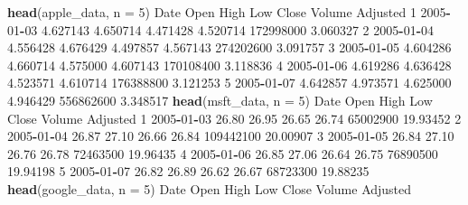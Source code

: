\documentclass[]{article}
\newenvironment{Shaded}{\begin{snugshade}}{\end{snugshade}}
\newcommand{\KeywordTok}[1]{\textcolor[rgb]{0.13,0.29,0.53}{\textbf{#1}}}
\newcommand{\DataTypeTok}[1]{\textcolor[rgb]{0.13,0.29,0.53}{#1}}
\newcommand{\DecValTok}[1]{\textcolor[rgb]{0.00,0.00,0.81}{#1}}
\newcommand{\FloatTok}[1]{\textcolor[rgb]{0.00,0.00,0.81}{#1}}
\newcommand{\OperatorTok}[1]{\textcolor[rgb]{0.81,0.36,0.00}{\textbf{#1}}}
\newcommand{\NormalTok}[1]{#1}
\begin{document}
\begin{Shaded}
\begin{Highlighting}[]
\KeywordTok{head}\NormalTok{(apple_data, }\DataTypeTok{n =} \DecValTok{5}\NormalTok{)}
\NormalTok{        Date     Open     High      Low    Close    Volume Adjusted}
\DecValTok{1} \DecValTok{2005}\OperatorTok{-}\DecValTok{01}\OperatorTok{-}\DecValTok{03} \FloatTok{4.627143} \FloatTok{4.650714} \FloatTok{4.471428} \FloatTok{4.520714} \DecValTok{172998000} \FloatTok{3.060327}
\DecValTok{2} \DecValTok{2005}\OperatorTok{-}\DecValTok{01}\OperatorTok{-}\DecValTok{04} \FloatTok{4.556428} \FloatTok{4.676429} \FloatTok{4.497857} \FloatTok{4.567143} \DecValTok{274202600} \FloatTok{3.091757}
\DecValTok{3} \DecValTok{2005}\OperatorTok{-}\DecValTok{01}\OperatorTok{-}\DecValTok{05} \FloatTok{4.604286} \FloatTok{4.660714} \FloatTok{4.575000} \FloatTok{4.607143} \DecValTok{170108400} \FloatTok{3.118836}
\DecValTok{4} \DecValTok{2005}\OperatorTok{-}\DecValTok{01}\OperatorTok{-}\DecValTok{06} \FloatTok{4.619286} \FloatTok{4.636428} \FloatTok{4.523571} \FloatTok{4.610714} \DecValTok{176388800} \FloatTok{3.121253}
\DecValTok{5} \DecValTok{2005}\OperatorTok{-}\DecValTok{01}\OperatorTok{-}\DecValTok{07} \FloatTok{4.642857} \FloatTok{4.973571} \FloatTok{4.625000} \FloatTok{4.946429} \DecValTok{556862600} \FloatTok{3.348517}
\KeywordTok{head}\NormalTok{(msft_data, }\DataTypeTok{n =} \DecValTok{5}\NormalTok{)}
\NormalTok{        Date  Open  High   Low Close    Volume Adjusted}
\DecValTok{1} \DecValTok{2005}\OperatorTok{-}\DecValTok{01}\OperatorTok{-}\DecValTok{03} \FloatTok{26.80} \FloatTok{26.95} \FloatTok{26.65} \FloatTok{26.74}  \DecValTok{65002900} \FloatTok{19.93452}
\DecValTok{2} \DecValTok{2005}\OperatorTok{-}\DecValTok{01}\OperatorTok{-}\DecValTok{04} \FloatTok{26.87} \FloatTok{27.10} \FloatTok{26.66} \FloatTok{26.84} \DecValTok{109442100} \FloatTok{20.00907}
\DecValTok{3} \DecValTok{2005}\OperatorTok{-}\DecValTok{01}\OperatorTok{-}\DecValTok{05} \FloatTok{26.84} \FloatTok{27.10} \FloatTok{26.76} \FloatTok{26.78}  \DecValTok{72463500} \FloatTok{19.96435}
\DecValTok{4} \DecValTok{2005}\OperatorTok{-}\DecValTok{01}\OperatorTok{-}\DecValTok{06} \FloatTok{26.85} \FloatTok{27.06} \FloatTok{26.64} \FloatTok{26.75}  \DecValTok{76890500} \FloatTok{19.94198}
\DecValTok{5} \DecValTok{2005}\OperatorTok{-}\DecValTok{01}\OperatorTok{-}\DecValTok{07} \FloatTok{26.82} \FloatTok{26.89} \FloatTok{26.62} \FloatTok{26.67}  \DecValTok{68723300} \FloatTok{19.88235}
\KeywordTok{head}\NormalTok{(google_data, }\DataTypeTok{n =} \DecValTok{5}\NormalTok{)}
\NormalTok{        Date      Open      High      Low     Close   Volume  Adjusted}

\end{Highlighting}
\end{Shaded}
\end{document}
